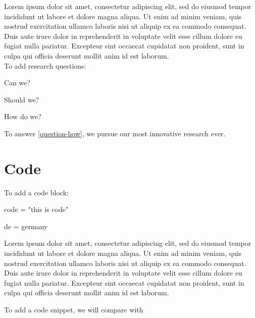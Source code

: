 Lorem ipsum dolor sit amet, consectetur adipiscing elit, sed do eiusmod tempor incididunt ut labore et dolore magna aliqua. Ut enim ad minim veniam, quis nostrud exercitation ullamco laboris nisi ut aliquip ex ea commodo consequat. Duis aute irure dolor in reprehenderit in voluptate velit esse cillum dolore eu fugiat nulla pariatur. Excepteur sint occaecat cupidatat non proident, sunt in culpa qui officia deserunt mollit anim id est laborum.\\
To add research questions:


\begin{questions}
 \item Can we? \label{question-can}
 \item Should we? \label{question-should}
 \item How do we? \label{question-how}
\end{questions}

To answer \ref{question-how}, we pursue our most innovative research ever.


\section{Code}

To add a code block:

\begin{code}
  code = "this
   is code"
  
  de = germany
\end{code}



Lorem ipsum dolor sit amet, consectetur adipiscing elit, sed do eiusmod tempor incididunt ut labore et dolore magna aliqua. Ut enim ad minim veniam, quis nostrud exercitation ullamco laboris nisi ut aliquip ex ea commodo consequat. Duis aute irure dolor in reprehenderit in voluptate velit esse cillum dolore eu fugiat nulla pariatur. Excepteur sint occaecat cupidatat non proident, sunt in culpa qui officia deserunt mollit anim id est laborum.


To add a code snippet, we will compare  with 


